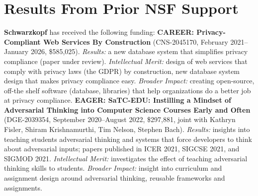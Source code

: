 %
%
%
%
%
%

\section{Results From Prior NSF Support}
\label{s:prior}

\textbf{Schwarzkopf} has received the following funding:
%
\textbf{CAREER: Privacy-Compliant Web Services By Construction} (CNS-2045170, February 2021--January 2026, \$585,025).
%
\emph{Results:} a new database system that simplifies privacy compliance
(paper under review).
%
\emph{Intellectual Merit:} design of web services that comply with privacy
laws (\eg the GDPR) by construction, new database system design that makes
privacy compliance easy.
%
\emph{Broader Impact:} creating open-source, off-the shelf software
(database, libraries) that help organizations do a better job at privacy
compliance.
%
\textbf{EAGER: SaTC-EDU: Instilling a Mindset of Adversarial Thinking into
Computer Science Courses Early and Often} (DGE-2039354,
September 2020--August 2022, \$297,881, joint with Kathryn Fisler, Shiram
Krishnamurthi, Tim Nelson, Stephen Bach).
%
\emph{Results:} insights into teaching students adversarial thinking and
systems that force developers to think about adversarial inputs; papers
published in ICER 2021, SIGCSE 2021, and SIGMOD 2021.
%
\emph{Intellectual Merit:} investigates the effect of teaching adversarial
thinking skills to students.
%
\emph{Broader Impact:} insight into curriculum and assignment design
around adversarial thinking, reusable frameworks and assignments.
%

